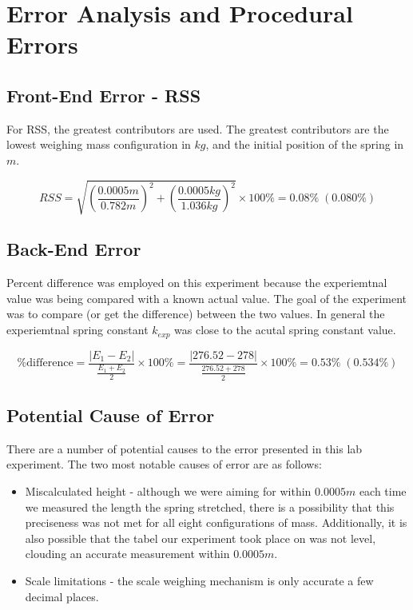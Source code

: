 \begingroup
\let\clearpage\relax\chapter{Error Analysis and Procedural Errors}

\section{Front-End Error - RSS}

For RSS, the greatest contributors are used. The greatest contributors are 
the lowest weighing mass configuration in $kg$, and the initial position of 
the spring in $m$.
  
  \begin{equation*}
    RSS = \sqrt{\left( \frac{0.0005m}{0.782m} \right)^2 
    + \left( \frac{0.0005kg}{1.036kg} \right)^2} \times 100\% = 0.08\% \; (0.080\%)
  \end{equation*}

\section{Back-End Error}

Percent difference was employed on this experiment because the experiemtnal value was 
being compared with a known actual value. The goal of the experiment was to compare (or
get the difference) between the two values. In general the experiemtnal spring constant $k_{exp}$
was close to the acutal spring constant value.

\begin{equation*}
  \%\text{difference}= \frac{|E_1 - E_2|}{\frac{E_1 + E_2}{2}} \times 100\% = 
  \frac{|276.52 - 278|}{\frac{276.52 + 278}{2}} \times 100\% = 0.53\% \; (0.534\%)
\end{equation*}

\section{Potential Cause of Error}

\noindent There are a number of potential causes to the error presented in this lab
experiment. The two most notable causes of error are as follows:

\begin{itemize}
  \item Miscalculated height - although we were aiming for within $0.0005m$ each time
        we measured the length the spring stretched, there is a possibility that this
        preciseness was not met for all eight configurations of mass. Additionally,
        it is also possible that the tabel our experiment took place on was not level,
        clouding an accurate measurement within $0.0005m$.
  
  \item Scale limitations - the scale weighing mechanism is only accurate a few
        decimal places.
  
\end{itemize}

